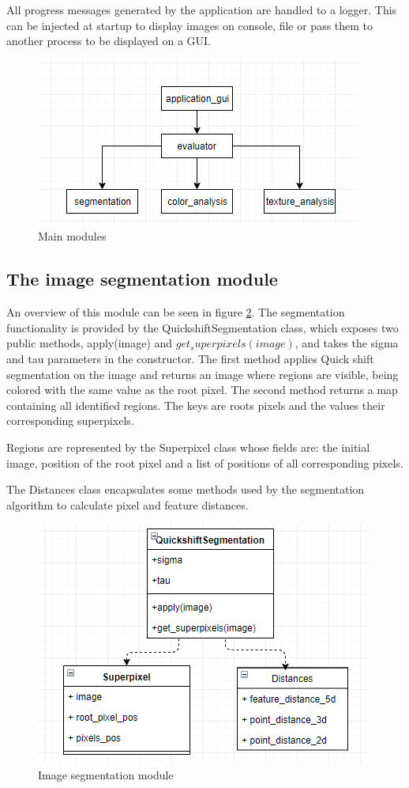 \documentclass[12pt]{report}
\begin{document}
	All progress messages generated by the application are handled to a logger. This can be injected at startup to display images on console, file or pass them to another process to be displayed on a GUI.
	
	\begin{figure}[h!]
		\centering
		\includegraphics[]{design/main_modules.png}
		\caption{Main modules}
		\label{fig:main_modules}
	\end{figure}

	\subsection{The image segmentation module}
	An overview of this module can be seen in figure \ref{fig:image_segmentation}. The segmentation functionality is provided by the QuickshiftSegmentation class, which exposes two public methods, apply(image) and $get_superpixels(image)$, and takes the sigma and tau parameters in the constructor. The first method applies Quick shift segmentation on the image and returns an image where regions are visible, being colored with the same value as the root pixel. The second method returns a map containing all identified regions. The keys are roots pixels and the values their corresponding superpixels. 
	
	Regions are represented by the Superpixel class whose fields are: the initial image, position of the root pixel and a list of positions of all corresponding pixels.
	
	The Distances class encapsulates some methods used by the segmentation algorithm to calculate pixel and feature distances.
	
	\begin{figure}[h!]
		\centering
		\includegraphics[]{design/image_segmentation.png}
		\caption{Image segmentation module}
		\label{fig:image_segmentation}
	\end{figure}
\end{document}
